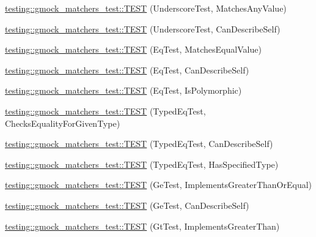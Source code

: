 \begin{DoxyCompactItemize}
\item 
\mbox{\hyperlink{namespacetesting_1_1gmock__matchers__test_a3fc77fa5ca709ef70963026fd7114552}{testing\+::gmock\+\_\+matchers\+\_\+test\+::\+T\+E\+ST}} (Underscore\+Test, Matches\+Any\+Value)
\item 
\mbox{\hyperlink{namespacetesting_1_1gmock__matchers__test_a25ae831c15c9ca918ed847ba147ac572}{testing\+::gmock\+\_\+matchers\+\_\+test\+::\+T\+E\+ST}} (Underscore\+Test, Can\+Describe\+Self)
\item 
\mbox{\hyperlink{namespacetesting_1_1gmock__matchers__test_a2ac5d4c2fae3e7f2e6c6be657a61f86a}{testing\+::gmock\+\_\+matchers\+\_\+test\+::\+T\+E\+ST}} (Eq\+Test, Matches\+Equal\+Value)
\item 
\mbox{\hyperlink{namespacetesting_1_1gmock__matchers__test_a1c86e845cb44f34eeac4863041c871c6}{testing\+::gmock\+\_\+matchers\+\_\+test\+::\+T\+E\+ST}} (Eq\+Test, Can\+Describe\+Self)
\item 
\mbox{\hyperlink{namespacetesting_1_1gmock__matchers__test_ac3ea755ba2a8bb480cee70aa37ccafc2}{testing\+::gmock\+\_\+matchers\+\_\+test\+::\+T\+E\+ST}} (Eq\+Test, Is\+Polymorphic)
\item 
\mbox{\hyperlink{namespacetesting_1_1gmock__matchers__test_a3e8d6cc259c1410a85572bc773bb21b9}{testing\+::gmock\+\_\+matchers\+\_\+test\+::\+T\+E\+ST}} (Typed\+Eq\+Test, Checks\+Equality\+For\+Given\+Type)
\item 
\mbox{\hyperlink{namespacetesting_1_1gmock__matchers__test_a9baf261536023ac58ed65cdafcaf1602}{testing\+::gmock\+\_\+matchers\+\_\+test\+::\+T\+E\+ST}} (Typed\+Eq\+Test, Can\+Describe\+Self)
\item 
\mbox{\hyperlink{namespacetesting_1_1gmock__matchers__test_ae0255a5de2ef537512379c3f8ff9e34f}{testing\+::gmock\+\_\+matchers\+\_\+test\+::\+T\+E\+ST}} (Typed\+Eq\+Test, Has\+Specified\+Type)
\item 
\mbox{\hyperlink{namespacetesting_1_1gmock__matchers__test_a7d73fdbbee36ccf241ec6e328175655b}{testing\+::gmock\+\_\+matchers\+\_\+test\+::\+T\+E\+ST}} (Ge\+Test, Implements\+Greater\+Than\+Or\+Equal)
\item 
\mbox{\hyperlink{namespacetesting_1_1gmock__matchers__test_a2718c8d5456b62ab7b060b2723939a72}{testing\+::gmock\+\_\+matchers\+\_\+test\+::\+T\+E\+ST}} (Ge\+Test, Can\+Describe\+Self)
\item 
\mbox{\hyperlink{namespacetesting_1_1gmock__matchers__test_a87a9ac189a12e0b85964f03b3b9998b1}{testing\+::gmock\+\_\+matchers\+\_\+test\+::\+T\+E\+ST}} (Gt\+Test, Implements\+Greater\+Than)

\end{DoxyCompactItemize}
